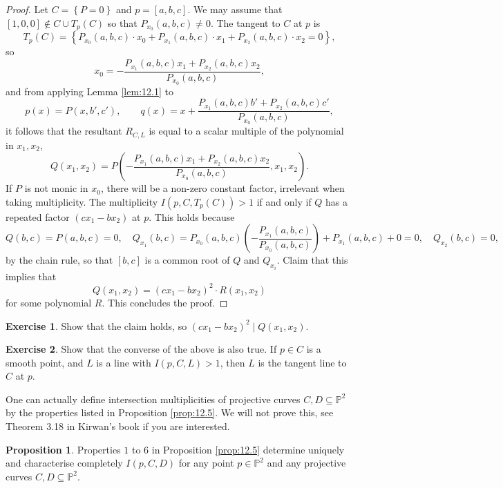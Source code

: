 \documentclass{article}
\renewcommand{\P}{\mathbb{P}}
\newcommand{\rb}[1]{\left( #1 \right)}
\renewcommand{\sb}[1]{\left[ #1 \right]}
\newcommand{\cb}[1]{\left\{ #1 \right\}}
\theoremstyle{definition}\newtheorem{definition}{Definition}[section]
\theoremstyle{definition}\newtheorem{notation}[definition]{Notation}
\theoremstyle{definition}\newtheorem{remark}[definition]{Remark}
\theoremstyle{definition}\newtheorem{example1}[definition]{Example}
\theoremstyle{definition}\newtheorem{fact}{Fact}
\theoremstyle{definition}\newtheorem{exercise}{Exercise}
\theoremstyle{definition}\newtheorem*{example2}{Example}
\newtheorem{proposition}[definition]{Proposition}
\begin{document}
\begin{proof}
Let $ C = \cb{P = 0} $ and $ p = \sb{a, b, c} $. We may assume that $ \sb{1, 0, 0} \notin C \cup T_p\rb{C} $ so that $ P_{x_0}\rb{a, b, c} \ne 0 $. The tangent to $ C $ at $ p $ is
$$ T_p\rb{C} = \cb{P_{x_0}\rb{a, b, c} \cdot x_0 + P_{x_1}\rb{a, b, c} \cdot x_1 + P_{x_2}\rb{a, b, c} \cdot x_2 = 0}, $$
so
$$ x_0 = -\dfrac{P_{x_1}\rb{a, b, c}x_1 + P_{x_2}\rb{a, b, c}x_2}{P_{x_0}\rb{a, b, c}}, $$
and from applying Lemma \ref{lem:12.1} to
$$ p\rb{x} = P\rb{x, b', c'}, \qquad q\rb{x} = x + \dfrac{P_{x_1}\rb{a, b, c}b' + P_{x_2}\rb{a, b, c}c'}{P_{x_0}\rb{a, b, c}}, $$
it follows that the resultant $ R_{C, L} $ is equal to a scalar multiple of the polynomial in $ x_1, x_2 $,
$$ Q\rb{x_1, x_2} = P\rb{-\dfrac{P_{x_1}\rb{a, b, c}x_1 + P_{x_2}\rb{a, b, c}x_2}{P_{x_0}\rb{a, b, c}}, x_1, x_2}. $$
If $ P $ is not monic in $ x_0 $, there will be a non-zero constant factor, irrelevant when taking multiplicity. The multiplicity $ I\rb{p, C, T_p\rb{C}} > 1 $ if and only if $ Q $ has a repeated factor $ \rb{cx_1 - bx_2} $ at $ p $. This holds because
$$ Q\rb{b, c} = P\rb{a, b, c} = 0, \quad Q_{x_1}\rb{b, c} = P_{x_0}\rb{a, b, c}\rb{-\dfrac{P_{x_1}\rb{a, b, c}}{P_{x_0}\rb{a, b, c}}} + P_{x_1}\rb{a, b, c} + 0 = 0, \quad Q_{x_2}\rb{b, c} = 0, $$
by the chain rule, so that $ \sb{b, c} $ is a common root of $ Q $ and $ Q_{x_i} $. Claim that this implies that
$$ Q\rb{x_1, x_2} = \rb{cx_1 - bx_2}^2 \cdot R\rb{x_1, x_2} $$
for some polynomial $ R $. This concludes the proof.
\end{proof}

\begin{exercise}
Show that the claim holds, so $ \rb{cx_1 - bx_2}^2 \mid Q\rb{x_1, x_2} $.
\end{exercise}

\begin{exercise}
Show that the converse of the above is also true. If $ p \in C $ is a smooth point, and $ L $ is a line with $ I\rb{p, C, L} > 1 $, then $ L $ is the tangent line to $ C $ at $ p $.
\end{exercise}

One can actually define intersection multiplicities of projective curves $ C, D \subseteq \P^2 $ by the properties listed in Proposition \ref{prop:12.5}. We will not prove this, see Theorem 3.18 in Kirwan's book if you are interested.

\begin{proposition}
\label{prop:12.8}
Properties $ 1 $ to $ 6 $ in Proposition \ref{prop:12.5} determine uniquely and characterise completely $ I\rb{p, C, D} $ for any point $ p \in \P^2 $ and any projective curves $ C, D \subseteq \P^2 $.
\end{proposition}
\end{document}
